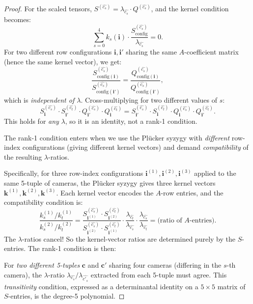 \begin{proof}
For the scaled tensors, $S^{(\widehat{c_s})} = \lambda_{\widehat{c_s}}\cdot Q^{(\widehat{c_s})}$,
and the kernel condition becomes:
\[
  \sum_{s=0}^{4} k_s(\mathbf{i})\cdot\frac{S^{(\widehat{c_s})}_{\text{config}}}
  {\lambda_{\widehat{c_s}}} = 0.
\]
For two different row configurations $\mathbf{i},\mathbf{i}'$ sharing the same
$A$-coefficient matrix (hence the same kernel vector), we get:
\[
  \frac{S^{(\widehat{c_s})}_{\text{config}(\mathbf{i})}}
  {S^{(\widehat{c_s})}_{\text{config}(\mathbf{i}')}}
  = \frac{Q^{(\widehat{c_s})}_{\text{config}(\mathbf{i})}}
  {Q^{(\widehat{c_s})}_{\text{config}(\mathbf{i}')}},
\]
which is \emph{independent of $\lambda$}. Cross-multiplying for two different
values of $s$:
\begin{equation}\label{eq:p9-cross}
  S^{(\widehat{c_s})}_{\mathbf{i}}\cdot S^{(\widehat{c_t})}_{\mathbf{i}'}
  \cdot Q^{(\widehat{c_s})}_{\mathbf{i}'}\cdot Q^{(\widehat{c_t})}_{\mathbf{i}}
  = S^{(\widehat{c_s})}_{\mathbf{i}'}\cdot S^{(\widehat{c_t})}_{\mathbf{i}}
  \cdot Q^{(\widehat{c_s})}_{\mathbf{i}}\cdot Q^{(\widehat{c_t})}_{\mathbf{i}'}.
\end{equation}
This holds for \emph{any} $\lambda$, so it is an identity, not a rank-1 condition.

The rank-1 condition enters when we use the Pl\"ucker syzygy with
\emph{different} row-index configurations (giving different kernel vectors)
and demand \emph{compatibility} of the resulting $\lambda$-ratios.

Specifically, for three row-index configurations $\mathbf{i}^{(1)},\mathbf{i}^{(2)},\mathbf{i}^{(3)}$
applied to the same 5-tuple of cameras, the Pl\"ucker syzygy gives three
kernel vectors $\mathbf{k}^{(1)},\mathbf{k}^{(2)},\mathbf{k}^{(3)}$.
Each kernel vector encodes the $A$-row entries, and the compatibility
condition is:
\begin{equation}\label{eq:p9-compat}
  \frac{k^{(1)}_s / k^{(1)}_t}{k^{(2)}_s / k^{(2)}_t}
  = \frac{S^{(\widehat{c_s})}_{\mathbf{i}^{(1)}}\cdot S^{(\widehat{c_t})}_{\mathbf{i}^{(2)}}}
  {S^{(\widehat{c_s})}_{\mathbf{i}^{(2)}}\cdot S^{(\widehat{c_t})}_{\mathbf{i}^{(1)}}}
  \cdot \frac{\lambda_{\widehat{c_t}}}{\lambda_{\widehat{c_s}}}
  \cdot \frac{\lambda_{\widehat{c_s}}}{\lambda_{\widehat{c_t}}} = \text{(ratio of }A\text{-entries)}.
\end{equation}
The $\lambda$-ratios cancel! So the kernel-vector ratios are determined purely
by the $S$-entries. The rank-1 condition is then:

For \emph{two different 5-tuples} $\mathbf{c}$ and $\mathbf{c}'$ sharing four
cameras (differing in the $s$-th camera), the $\lambda$-ratio
$\lambda_{\widehat{c_s}}/\lambda_{\widehat{c'_s}}$ extracted from each 5-tuple
must agree. This \emph{transitivity} condition, expressed as a
determinantal identity on a $5\times 5$ matrix of $S$-entries, is the degree-5 polynomial.


\end{proof}

